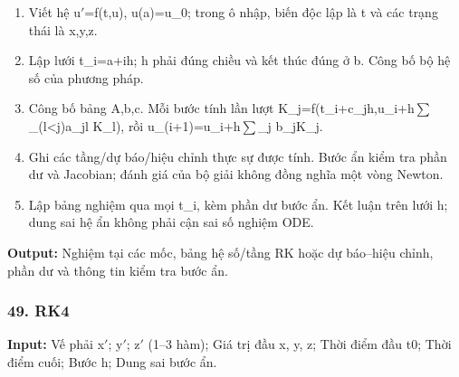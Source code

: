 \begin{enumerate}

\item Viết hệ u\ensuremath{\prime}=\allowbreak{}f(\allowbreak{}t,\allowbreak{}u),\allowbreak{} u(\allowbreak{}a)=\allowbreak{}u\_0;\allowbreak{} trong ô nhập,\allowbreak{} biến độc lập là t và các trạng thái là x,\allowbreak{}y,\allowbreak{}z.

\item Lập lưới t\_i=\allowbreak{}a+\allowbreak{}ih;\allowbreak{} h phải đúng chiều và kết thúc đúng ở b. Công bố bộ hệ số của phương pháp.

\item Công bố bảng A,\allowbreak{}b,\allowbreak{}c. Mỗi bước tính lần lượt K\_j=\allowbreak{}f(\allowbreak{}t\_i+\allowbreak{}c\_jh,\allowbreak{}u\_i+\allowbreak{}h\ensuremath{\sum}\_(\allowbreak{}l<j)a\_jl K\_l),\allowbreak{} rồi u\_(\allowbreak{}i+\allowbreak{}1)=\allowbreak{}u\_i+\allowbreak{}h\ensuremath{\sum}\_j b\_jK\_j.

\item Ghi các tầng/\allowbreak{}dự báo/\allowbreak{}hiệu chỉnh thực sự được tính. Bước ẩn kiểm tra phần dư và Jacobian;\allowbreak{} đánh giá của bộ giải không đồng nghĩa một vòng Newton.

\item Lập bảng nghiệm qua mọi t\_i,\allowbreak{} kèm phần dư bước ẩn. Kết luận trên lưới h;\allowbreak{} dung sai hệ ẩn không phải cận sai số nghiệm ODE.

\end{enumerate}

\textbf{Output:} Nghiệm tại các mốc,\allowbreak{} bảng hệ số/\allowbreak{}tầng RK hoặc dự báo–hiệu chỉnh,\allowbreak{} phần dư và thông tin kiểm tra bước ẩn.

\examplebreak\subsubsection*{49. RK4}

\textbf{Input:} Vế phải x\ensuremath{\prime};\allowbreak{} y\ensuremath{\prime};\allowbreak{} z\ensuremath{\prime} (\allowbreak{}1–3 hàm);\allowbreak{} Giá trị đầu x,\allowbreak{} y,\allowbreak{} z;\allowbreak{} Thời điểm đầu t0;\allowbreak{} Thời điểm cuối;\allowbreak{} Bước h;\allowbreak{} Dung sai bước ẩn.

